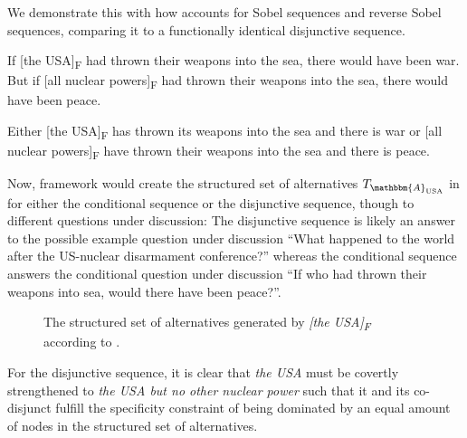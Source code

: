 We demonstrate this with how \textcite{Ippolito2020} accounts for Sobel sequences and reverse Sobel sequences, comparing it to a functionally identical disjunctive sequence.

\pex
\a If [the USA]\textsubscript{F} had thrown their weapons into the sea, there would have been war.
\a But if [all nuclear powers]\textsubscript{F} had thrown their weapons into the sea, there would have been peace.
\xe

\ex
Either [the USA]\textsubscript{F} has thrown its weapons into the sea and there is war or [all nuclear powers]\textsubscript{F} have thrown their weapons into the sea and there is peace.
\xe

Now,  framework would create the structured set of alternatives $T_{\mathbbm{A}_\text{USA}}$ in  for either the conditional sequence or the disjunctive sequence, though to different questions under discussion: The disjunctive sequence is likely an answer to the possible example question under discussion \enquote{What happened to the world after the US-nuclear disarmament conference?} whereas the conditional sequence answers the conditional question under discussion \enquote{If who had thrown their weapons into sea, would there have been peace?}.

\begin{figure}[!htb]
    \centering\hspace{-2cm}
    
    \caption{The structured set of alternatives generated by \textit{[the USA]\textsubscript{F}} according to \textcite{Ippolito2020}.}
\end{figure}

For the disjunctive sequence, it is clear that \textit{the USA} must be covertly strengthened to \textit{the USA but no other nuclear power} such that it and its co-disjunct fulfill the specificity constraint of being dominated by an equal amount of nodes in the structured set of alternatives.

